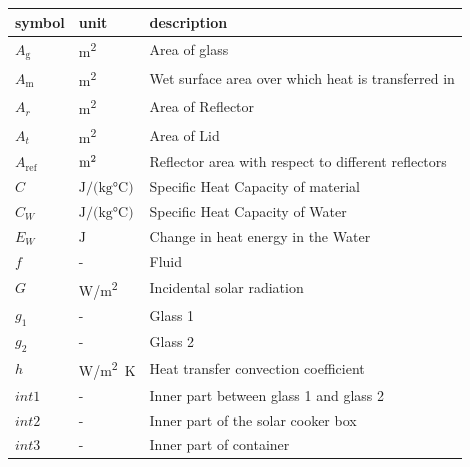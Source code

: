 \documentclass[12pt]{article}
\begin{document}
\renewcommand{\arraystretch}{1.2}
\noindent \begin{longtable*}{l l p{12cm}} \toprule
\textbf{symbol} & \textbf{unit} & \textbf{description}\\
\midrule 

$A_\text{g}$ & \si[per-mode=symbol] {\square\metre} & Area of glass
\\ 

$A_\text{m}$ & \si[per-mode=symbol] {\square\metre} & Wet surface area over which heat is transferred in
\\ 

$A_r$ & \si[per-mode=symbol] {\square\metre} & Area of Reflector
\\

$A_t$ & \si[per-mode=symbol] {\square\metre} & Area of Lid 
\\


$A_\text{ref}$ & $\si[per-mode=symbol] {\square\metre} $ & Reflector area with respect to different reflectors \\

$C$ & $\si{\joule\per(\kilogram \celsius)}$ & Specific Heat Capacity of material \\

$C_W$ & $\si{\joule\per(\kilogram \celsius)}$ & Specific Heat Capacity of Water \\

$E_W$ & $\si{\joule}$ & Change in heat energy in the Water \\

$f$ & - & Fluid \\

$G$ & \si[per-mode=symbol]{\watt\per\square\metre} & Incidental solar radiation \\

$g_1$ & - & Glass 1\\

$g_2$ & - & Glass 2 \\

$h$ & \si[per-mode=symbol]{\watt\per\square\metre K} & Heat transfer convection coefficient \\

$int1$ & - & Inner part between glass 1 and glass 2 \\

$int2$ & - & Inner part of the solar cooker box \\

$int3$ & - & Inner part of container \\


\end{longtable*}
\end{document}
